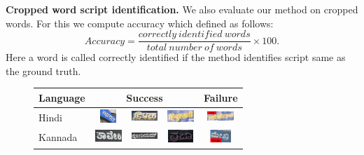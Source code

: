 \noindent \textbf{Cropped word script identification.}
We also evaluate our method on cropped words. For this we compute
accuracy which defined as follows:
\begin{equation}
Accuracy = \frac{{correctly~identified~words}}{{total~number~of~words}} \times 100.
\end{equation}
Here a word is called correctly identified if the method identifies script same as the ground truth.

\begin{figure}[t!]
\centering
\renewcommand{\arraystretch}{2.1}
\begin{tabular}{|l||ccc||c|}
\hline
\textbf{Language} & \multicolumn{3}{c||}{\textbf{Success}} & \multicolumn{1}{c|}{\textbf{Failure}} \\
\hline\hline
Hindi & \includegraphics[height=0.5cm,width=1.0cm]{figures/Results/Success/Hindi_4.jpg} & \includegraphics[height=0.5cm,width=1.0cm]{figures/Results/Success/Hindi_5.jpg} & \includegraphics[height=0.5cm,width=1.0cm]{figures/Results/Success/Hindi_6.jpg} & \includegraphics[height=0.5cm,width=1cm]{figures/Results/Failure/eng_tam.png} \\
Kannada & \includegraphics[height=0.5cm,width=1.0cm]{figures/Results/Success/Kannada_2.png} & \includegraphics[height=0.5cm,width=1.0cm,width=1cm]{figures/Results/Success/Kannada_3.png} & \includegraphics[height=0.5cm,width=1.0cm]{figures/Results/Success/Kannada_4.png} & \includegraphics[height=0.5cm,width=1.0cm]{figures/Results/Failure/Kannada-Telugu_4.png} \\

\end{tabular}
\end{figure}
